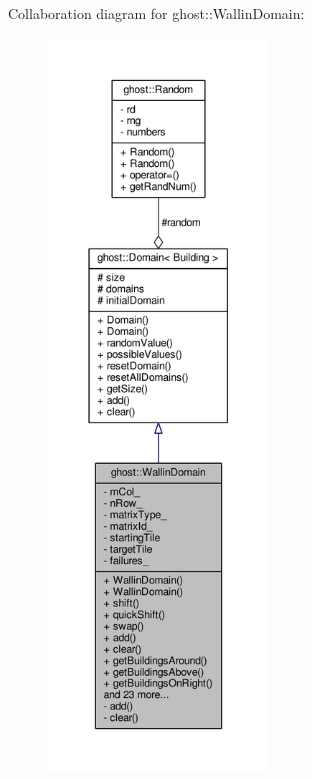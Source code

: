 Collaboration diagram for ghost\-:\-:Wallin\-Domain\-:\nopagebreak
\begin{figure}[H]
\begin{center}
\leavevmode
\includegraphics[height=550pt]{classghost_1_1WallinDomain__coll__graph}
\end{center}
\end{figure}
